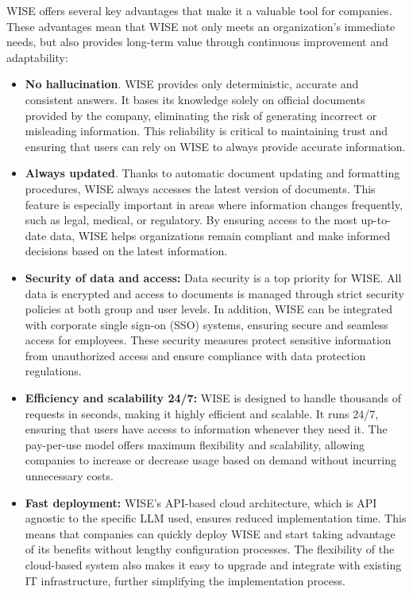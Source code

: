 WISE offers several key advantages that make it a valuable tool for companies. These advantages mean that WISE not only meets an organization's immediate needs, but also provides long-term value through continuous improvement and adaptability:

\begin{itemize}    
    \item \textbf{No hallucination}. WISE provides only deterministic, accurate and consistent answers. It bases its knowledge solely on official documents provided by the company, eliminating the risk of generating incorrect or misleading information. This reliability is critical to maintaining trust and ensuring that users can rely on WISE to always provide accurate information.
    
    \item \textbf{Always updated}. Thanks to automatic document updating and formatting procedures, WISE always accesses the latest version of documents. This feature is especially important in areas where information changes frequently, such as legal, medical, or regulatory. By ensuring access to the most up-to-date data, WISE helps organizations remain compliant and make informed decisions based on the latest information.
    
    \item \textbf{Security of data and access:} Data security is a top priority for WISE. All data is encrypted and access to documents is managed through strict security policies at both group and user levels. In addition, WISE can be integrated with corporate single sign-on (SSO) systems, ensuring secure and seamless access for employees. These security measures protect sensitive information from unauthorized access and ensure compliance with data protection regulations.
    
    \item \textbf{Efficiency and scalability 24/7:} WISE is designed to handle thousands of requests in seconds, making it highly efficient and scalable. It runs 24/7, ensuring that users have access to information whenever they need it. The pay-per-use model offers maximum flexibility and scalability, allowing companies to increase or decrease usage based on demand without incurring unnecessary costs.
    
    \item \textbf{Fast deployment:} WISE's API-based cloud architecture, which is API agnostic to the specific LLM used, ensures reduced implementation time. This means that companies can quickly deploy WISE and start taking advantage of its benefits without lengthy configuration processes. The flexibility of the cloud-based system also makes it easy to upgrade and integrate with existing IT infrastructure, further simplifying the implementation process. \cite{hpa2024}
\end{itemize}


